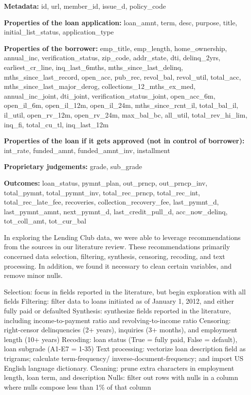 {\tt\raggedright\hyphenchar{}
{\bf Metadata:}
 id,
 url,
 member\_id,
 issue\_d,
 policy\_code

{\bf Properties of the loan application:}
 loan\_amnt,
 term,
 desc,
 purpose,
 title,
 initial\_list\_status,
 application\_type

{\bf Properties of the borrower:}
 emp\_title,
 emp\_length,
 home\_ownership,
 annual\_inc,
 verification\_status,
 zip\_code,
 addr\_state,
 dti,
 delinq\_2yrs,
 earliest\_cr\_line,
 inq\_last\_6mths,
 mths\_since\_last\_delinq,
 mths\_since\_last\_record,
 open\_acc,
 pub\_rec,
 revol\_bal,
 revol\_util,
 total\_acc,
 mths\_since\_last\_major\_derog,
 collections\_12\_mths\_ex\_med,
 annual\_inc\_joint,
 dti\_joint,
 verification\_status\_joint,
 open\_acc\_6m,
 open\_il\_6m,
 open\_il\_12m,
 open\_il\_24m,
 mths\_since\_rcnt\_il,
 total\_bal\_il,
 il\_util,
 open\_rv\_12m,
 open\_rv\_24m,
 max\_bal\_bc,
 all\_util,
 total\_rev\_hi\_lim,
 inq\_fi,
 total\_cu\_tl,
 inq\_last\_12m

{\bf Properties of the loan if it gets approved (not in control of borrower):}
 int\_rate,
 funded\_amnt,
 funded\_amnt\_inv,
 installment


{\bf Proprietary judgements:}
 grade,  sub\_grade


{\bf Outcomes:}
 loan\_status,
 pymnt\_plan,
 out\_prncp,
 out\_prncp\_inv,
 total\_pymnt,
 total\_pymnt\_inv,
 total\_rec\_prncp,
 total\_rec\_int,
 total\_rec\_late\_fee,
 recoveries,
 collection\_recovery\_fee,
 last\_pymnt\_d,
 last\_pymnt\_amnt,
 next\_pymnt\_d,
 last\_credit\_pull\_d,
 acc\_now\_delinq,
 tot\_coll\_amt,
 tot\_cur\_bal

}


In exploring the Lending Club data, we were able to leverage
recommendations from the sources in our literature review. These
recommendations primarily concerned data selection, filtering,
synthesis, censoring, recoding, and text processing. In addition, we
found it necessary to clean certain variables, and remove minor nulls.

\* Selection: focus in fields reported in the literature, but begin exploration with all fields
\* Filtering: filter data to loans initiated as of January 1, 2012, and either fully paid or defaulted
\* Synthesis: synthesize fields reported in the literature, including income-to-payment ratio and revolving-to-income ratio
\* Censoring: right-censor delinquencies (2+ years), inquiries (3+ months), and employment length (10+ years)
\* Recoding: loan status (True = fully paid, False = default), loan subgrade (A1-E7 = 1-35)
\* Text processing: vectorize loan description field as trigrams; calculate term-frequency/ inverse-document-frequency; and import US English language dictionary.
\* Cleaning: prune extra characters in employment length, loan term, and description
\* Nulls: filter out rows with nulls in a column where nulls compose less than 1\% of that column

